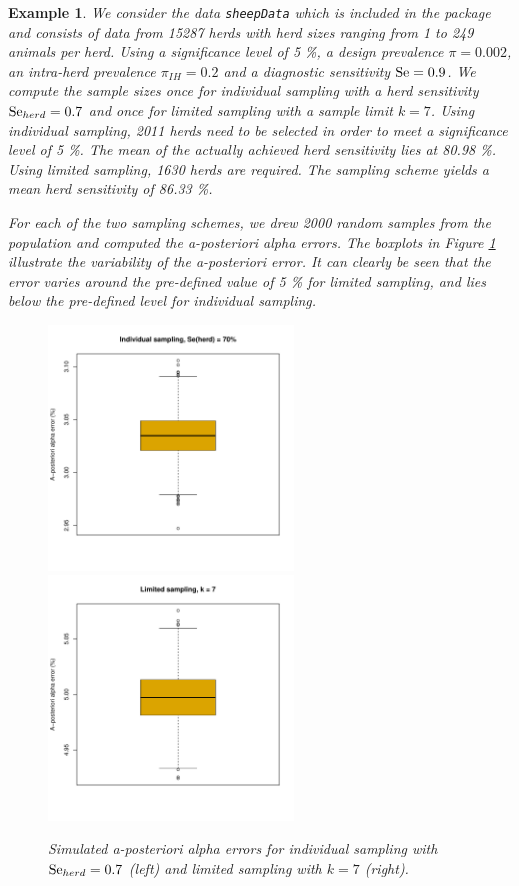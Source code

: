 \documentclass[nojss]{jss}
\newtheorem{example}{Example}[section]
\begin{document}
%
\begin{example} \label{ex:a_post_error1}
%
We consider the data \texttt{sheepData} which is included in the package and consists of data from 15287 herds with herd sizes ranging from 1 to 249 animals per herd. Using a significance level of 5 \%, a design prevalence $\pi = 0.002$, an intra-herd prevalence $\pi_{IH} = 0.2$ and a diagnostic sensitivity $\mbox{Se} = 0.9$. We compute the sample sizes once for individual sampling with a herd sensitivity $\mbox{Se}_{herd} = 0.7$ and once for limited sampling with a sample limit $k = 7$. Using individual sampling, 2011 herds need to be selected in order to meet a significance level of 5 \%. The mean of the actually achieved herd sensitivity lies at 80.98 \%. Using limited sampling, 1630 herds are required. The sampling scheme yields a mean herd sensitivity of 86.33 \%.

For each of the two sampling schemes, we drew 2000 random samples from the population and computed the a-posteriori alpha errors. The boxplots in Figure \ref{fig:aPostError_2} illustrate the variability of the a-posteriori error. It can clearly be seen that the error varies around the pre-defined value of 5 \% for limited sampling, and lies below the pre-defined level for individual sampling. %

\begin{figure}[h!t]
\begin{center}
\includegraphics[width=65mm]{aPostError_ind7}\quad \includegraphics[width=65mm]{aPostError_ltd7}
\end{center}
\caption{Simulated a-posteriori alpha errors for individual sampling with $\mbox{Se}_{herd} = 0.7$ (left) and limited sampling with $k = 7$ (right).}
\label{fig:aPostError_2}
\end{figure}
%
\end{example}
%
\end{document}
